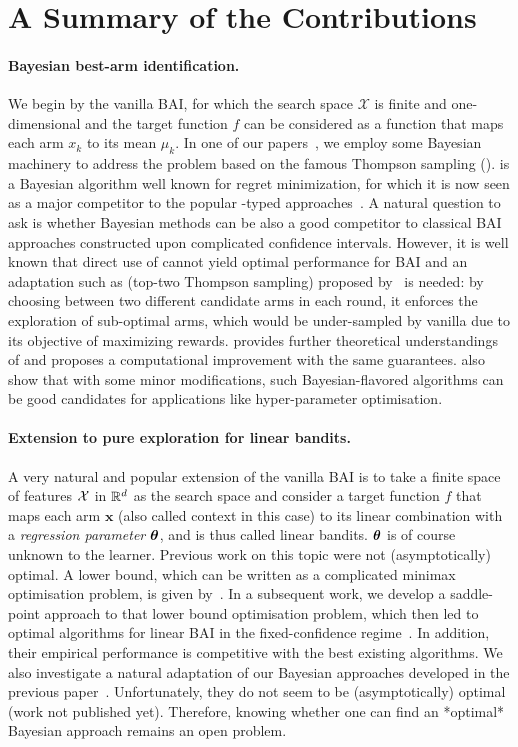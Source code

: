     
\section{A Summary of the Contributions}\label{sec:intro.contributions}

\paragraph{Bayesian best-arm identification.} We begin by the vanilla BAI, for which the search space $\mathcal{X}$ is finite and one-dimensional and the target function $f$ can be considered as a function that maps each arm $x_k$ to its mean $\mu_k$. In one of our papers~\citep{shang2020t3c}, we employ some Bayesian machinery to address the problem based on the famous Thompson sampling (\TS). \TS is a Bayesian algorithm well known for regret minimization, for which it is now seen as a major competitor to the popular \UCB-typed approaches~\citep{auer2002ucb}. A natural question to ask is whether Bayesian methods can be also a good competitor to classical BAI approaches constructed upon complicated confidence intervals. However, it is well known that direct use of \TS cannot yield optimal performance for BAI and an adaptation such as \TTTS (top-two Thompson sampling) proposed by~\cite{russo2016ttts} is needed: by choosing between two different candidate arms in each round, it enforces the exploration of sub-optimal arms, which would be under-sampled by vanilla \TS due to its objective of maximizing rewards. \cite{shang2020t3c} provides further theoretical understandings of \TTTS and proposes a computational improvement \TCC with the same guarantees. \cite{shang2019dttts} also show that with some minor modifications, such Bayesian-flavored algorithms can be good candidates for applications like hyper-parameter optimisation.

\paragraph{Extension to pure exploration for linear bandits.} A very natural and popular extension of the vanilla BAI is to take a finite space of features $\mathcal{X}$ in $\mathbb{R}^d$ as the search space and consider a target function $f$ that maps each arm $\mathbf{x}$ (also called context in this case) to its linear combination with a \emph{regression parameter} ${\boldsymbol \theta}$, and is thus called linear bandits. ${\boldsymbol \theta}$ is of course unknown to the learner. Previous work on this topic were not (asymptotically) optimal. A lower bound, which can be written as a complicated minimax optimisation problem, is given by~\cite{garivier2016tracknstop}. In a subsequent work, we develop a saddle-point approach to that lower bound optimisation problem, which then led to optimal algorithms for linear BAI in the fixed-confidence regime~\citep{degenne2020game}. In addition, their empirical performance is competitive with the best existing algorithms. We also investigate a natural adaptation of our Bayesian approaches developed in the previous paper~\citep{shang2020t3c}. Unfortunately, they do not seem to be (asymptotically) optimal (work not published yet). Therefore, knowing whether one can find an *optimal* Bayesian approach remains an open problem.

